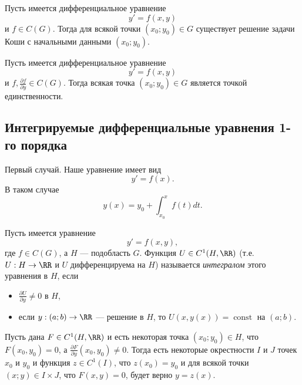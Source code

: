 \documentclass[12pt,a4paper]{article}
\DeclareMathOperator{\const}{const}
\begin{document}
    \begin{theorem}
        Пусть имеется дифференциальное уравнение
        \[y' = f(x, y)\]
        и $f \in C(G)$. Тогда для всякой точки $(x_0; y_0) \in G$ существует решение задачи Коши с начальными данными $(x_0; y_0)$.
    \end{theorem}

    \begin{theorem}
        Пусть имеется дифференциальное уравнение
        \[y' = f(x, y)\]
        и $f, \frac{\partial f}{\partial y} \in C(G)$. Тогда всякая точка $(x_0; y_0) \in G$ является точкой единственности.
    \end{theorem}

    \subsection{Интегрируемые дифференциальные уравнения 1-го порядка}

    Первый случай. Наше уравнение имеет вид
    \[y' = f(x).\]
    В таком случае
    \[y(x) = y_0 + \int_{x_0}^x f(t) dt.\]

    \begin{definition}
        Пусть имеется уравнение
        \[y' = f(x, y),\]
        где $f \in C(G)$, а $H$ --- подобласть $G$. Функция $U \in C^1(H, \RR)$ (т.е. $U: H \to \RR$ и $U$ дифференцируема на $H$) называется \emph{интегралом} этого уравнения в $H$, если
        \begin{itemize}
            \item $\frac{\partial U}{\partial y} \neq 0$ в $H$,
            \item если $y: (a; b) \to \RR$ --- решение в $H$, то $U(x, y(x)) = \const$ на $(a; b)$.
        \end{itemize}
    \end{definition}

    \begin{theorem}
        Пусть дана $F \in C^1(H, \RR)$ и есть некоторая точка $(x_0; y_0) \in H$, что $F(x_0, y_0) = 0$, а $\frac{\partial F}{\partial y}(x_0, y_0) \neq 0$. Тогда есть некоторые окрестности $I$ и $J$ точек $x_0$ и $y_0$ и функция $z \in C^1(I)$, что $z(x_0) = y_0$ и для всякой точки $(x; y) \in I \times J$, что $F(x, y) = 0$, будет верно $y = z(x)$.
    \end{theorem}
\end{document}
